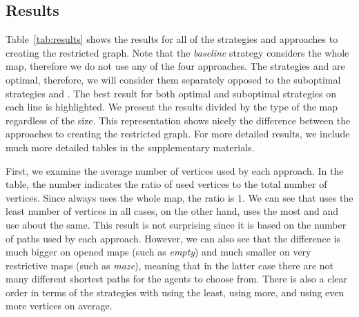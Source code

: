 \subsection{Results}




Table~\ref{tab:results} shows the results for all of the strategies and approaches to creating the restricted graph. Note that the \emph{baseline} strategy \ssb{} considers the whole map, therefore we do not use any of the four approaches. The strategies \ssb{} and \ssp{} are optimal, therefore, we will consider them separately opposed to the suboptimal strategies \ssc{} and \ssm{}. The best result for both optimal and suboptimal strategies on each line is highlighted. We present the results divided by the type of the map regardless of the size. This representation shows nicely the difference between the approaches to creating the restricted graph. For more detailed results, we include much more detailed tables in the supplementary materials.

First, we examine the average number of vertices used by each approach. In the table, the number indicates the ratio of used vertices to the total number of vertices. Since \ssb{} always uses the whole map, the ratio is $1$. We can see that \pss{} uses the least number of vertices in all cases, on the other hand, \psa{} uses the most and \psd{} and \psr{} use about the same. This result is not surprising since it is based on the number of paths used by each approach. However, we can also see that the difference is much bigger on opened maps (such as \emph{empty}) and much smaller on very restrictive maps (such as \emph{maze}), meaning that in the latter case there are not many different shortest paths for the agents to choose from. There is also a clear order in terms of the strategies with \ssp{} using the least, \ssc{} using more, and \ssm{} using even more vertices on average.

